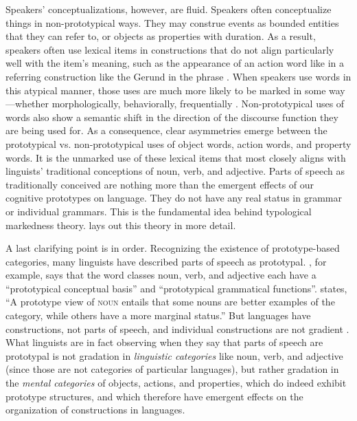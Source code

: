 Speakers' conceptualizations, however, are fluid. Speakers often conceptualize things in non-prototypical ways. They may construe events as bounded entities that they can refer to, or objects as properties with duration. As a result, speakers often use lexical items in constructions that do not align particularly well with the item's meaning, such as the appearance of an action word like  in a referring construction like the Gerund in the phrase . When speakers use words in this atypical manner, those uses are much more likely to be marked in some way—whether morphologically, behaviorally, frequentially \parencite[§2.2]{Croft1991}. Non-prototypical uses of words also show a semantic shift in the direction of the discourse function they are being used for. As a consequence, clear asymmetries emerge between the prototypical vs. non-prototypical uses of object words, action words, and property words. It is the unmarked use of these lexical items that most closely aligns with linguists' traditional conceptions of noun, verb, and adjective. Parts of speech as traditionally conceived are nothing more than the emergent effects of our cognitive prototypes on language. They do not have any real status in grammar or individual grammars. This is the fundamental idea behind typological markedness theory.  lays out this theory in more detail.

A last clarifying point is in order. Recognizing the existence of prototype-based categories, many linguists have described parts of speech as prototypal. \textcite[1--2]{Dixon2004}, for example, says that the word classes noun, verb, and adjective each have a \enquote{prototypical conceptual basis} and \enquote{prototypical grammatical functions}. \textcite[217]{Taylor2003} states, \enquote{A prototype view of \textsc{noun} entails that some nouns are better examples of the category, while others have a more marginal status.} But languages have constructions, not parts of speech, and individual constructions are not gradient \parencite{Croft2007}. What linguists are in fact observing when they say that parts of speech are prototypal is not gradation in \emph{linguistic categories} like noun, verb, and adjective (since those are not categories of particular languages), but rather gradation in the \emph{mental categories} of objects, actions, and properties, which do indeed exhibit prototype structures, and which therefore have emergent effects on the organization of constructions in languages.

